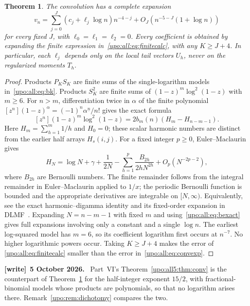 \documentclass[11pt,letterpaper]{article}
\newtheorem{theorem}{Theorem}[section]
\theoremstyle{remark}\newtheorem{remark}[theorem]{Remark}
\numberwithin{equation}{section}
\newcommand{\fall}[2]{#1^{\underline{#2}}}
\newenvironment{writenote}[1][]{\par\smallskip\begingroup\small
 \noindent\textbf{[write]}\if\relax\detokenize{#1}\relax\else~\textbf{#1.}\fi\ }%
 {\par\endgroup\smallskip}
\begin{document}
\begin{theorem}\label{upo:all:thm:conv}
The convolution has a complete expansion
\begin{equation}\label{upo:all:eq:convexp}
v_n=\sum_{j=0}^J(c_j+\ell_j\log n)n^{-4-j}
 +O_J(n^{-5-J}(1+\log n))
\end{equation}
for every fixed $J$, with $\ell_0=\ell_1=\ell_2=0$.
Every coefficient is obtained by expanding the finite expression
in~\eqref{upo:all:eq:finitecalc}, with any $K\ge J+4$.
In particular, each $\ell_j$ depends only on the local tail vectors
$U_h$, never on the regularized moments $T_h$.
\end{theorem}
\begin{proof}
Products $P_KS_K$ are finite sums of the single-logarithm models
in~\eqref{upo:all:eq:bk}. Products $S_K^2$ are finite sums of
$(1-z)^m\log^2(1-z)$ with $m\ge6$. For $n>m$, differentiation twice
in $\alpha$ of the finite polynomial
$[z^n](1-z)^\alpha=(-1)^n\fall\alpha n/n!$ gives the exact formula
\begin{equation}\label{upo:all:eq:log2}
[z^n](1-z)^m\log^2(1-z)
 =2b_m(n)(H_m-H_{n-m-1}).
\end{equation}
Here $H_m=\sum_{h=1}^m1/h$ and $H_0=0$; these scalar harmonic
numbers are distinct from the earlier half arrays $H_s(i,j)$.
For a fixed integer $p\ge0$, Euler--Maclaurin gives
\[
H_N=\log N+\gamma+\frac1{2N}
 -\sum_{h=1}^p\frac{B_{2h}}{2hN^{2h}}+O_p(N^{-2p-2}),
\]
where $B_{2h}$ are Bernoulli numbers. The finite remainder follows from
the integral remainder in Euler--Maclaurin applied to $1/x$; the
periodic Bernoulli function is bounded and the appropriate derivatives
are integrable on $[N,\infty)$. Equivalently, see the exact
harmonic--digamma identity and its fixed-order expansion in
DLMF~\cite{DLMFharm,DLMFEM}. Expanding $N=n-m-1$ with fixed $m$ and
using~\eqref{upo:all:eq:bexact} gives full expansions involving only a constant
and a single $\log n$. The earliest log-squared model has $m=6$, so its
coefficient logarithm first occurs at $n^{-7}$. No higher logarithmic
powers occur. Taking $K\ge J+4$ makes the error of
\eqref{upo:all:eq:finitecalc} smaller than the error in~\eqref{upo:all:eq:convexp}.
\end{proof}
\begin{writenote}[5 October 2026]
Part~VI's Theorem~\ref{upo:all5:thm:conv} is the counterpart of Theorem~\ref{upo:all:thm:conv} for the half-integer exponent $15/2$, with fractional-binomial models whose products are polynomials, so that no logarithm arises there. Remark~\ref{upo:rem:dichotomy} compares the two.
\end{writenote}
\end{document}
